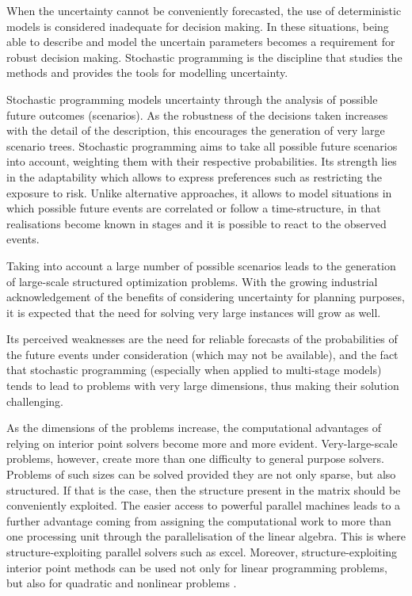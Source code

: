 
When the uncertainty cannot be conveniently forecasted, the use of 
deterministic models is considered inadequate for decision making. In 
these situations, being able to describe and model the uncertain parameters
becomes a requirement for robust decision making. Stochastic 
programming is the discipline that 
studies the methods and provides the tools for modelling uncertainty.

Stochastic programming models uncertainty through the analysis 
of possible future outcomes (scenarios). 
As the robustness of the decisions taken increases with the detail of the 
description, this encourages the generation of very large scenario trees.
Stochastic programming aims to take all possible future scenarios 
into account, weighting them
with their respective probabilities. Its strength lies in the
adaptability which allows to express preferences such as restricting
the exposure to risk. Unlike alternative approaches, it allows to model
situations in which possible future events are correlated or follow a
time-structure, in that realisations become known in stages and it is
possible to react to the observed events.

Taking into account a large number of possible scenarios leads
to the generation of large-scale structured optimization problems.
With the growing industrial acknowledgement of the benefits of 
considering uncertainty for planning purposes, it is expected that the 
need for solving very large instances will grow as well.

Its perceived weaknesses are the need for reliable forecasts
of the probabilities of the future events under consideration
(which may not be available), and the fact that stochastic programming
(especially when applied to multi-stage models) tends to lead to
problems with very large dimensions, thus making their solution
challenging. 

As the dimensions of the problems increase, the computational advantages 
of relying on interior point solvers become more and more evident. 
Very-large-scale problems, however, create more than one difficulty to general 
purpose solvers.
Problems of such sizes can be solved provided they are not only sparse,
but also structured. If that is the case, then the structure present 
in the matrix should be conveniently exploited.
The easier access to powerful parallel machines leads to a 
further advantage coming from assigning the computational work 
to more than one processing unit through the parallelisation of 
the linear algebra.
This is where structure-exploiting parallel solvers such as \OOPS 
\cite{GondzioSarkissian} excel. Moreover, structure-exploiting interior 
point methods can be used not only for linear programming problems, 
but also for quadratic and nonlinear problems \cite{GondzioGrothey04}.

